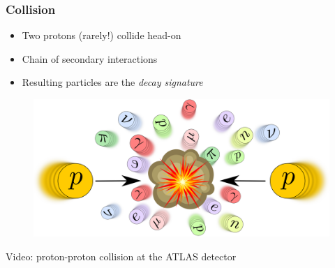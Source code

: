 \documentclass[14pt, t]{beamer}
\begin{document}
\begin{frame}
\frametitle{Collision}
    \begin{itemize}
    
        \item Two protons (rarely!) collide head-on

        \item Chain of secondary interactions

        \item Resulting particles are the \textit{decay signature}
    
    \end{itemize}

    \begin{figure}
        \centering
        \includegraphics[width=\linewidth]{vector/figures-presentation/collision.png}
    \end{figure}
\end{frame}

\begin{frame}[plain]

    \vspace{2mm}
    \begin{center}


        {\small Video: proton-proton collision at the ATLAS detector \cite{anim-atlas}}
    \end{center}

\end{frame}
\end{document}
